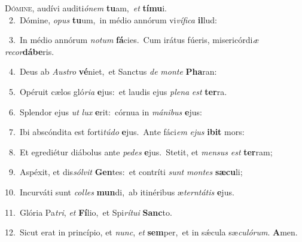 \lettrine{\initial\textcolor{\initialcolor}{D}}{ómine,} audívi auditi\-\textit{ó}\-\textit{nem} \textbf{tu}\-am,~\star \textit{et} \textbf{tí}\-\textbf{mu}i.\\
{\numbfont\textcolor{\numbcolor}{~2.}}~Dómine, \textit{o}\-\textit{pus} \textbf{tu}\-um,~\star in médio annórum vi\-\textit{ví}\-\textit{fi}\textit{ca} \textbf{il}\-lud:\par
{\numbfont\textcolor{\numbcolor}{~3.}}~In médio annórum \textit{no}\-\textit{tum} \textbf{fá}\-cies.~\star Cum irátus fúeris, misericórdi\textit{æ} \textit{re}\-\textit{cor}\textbf{dá}\textbf{be}ris.\par
{\numbfont\textcolor{\numbcolor}{~4.}}~Deus ab \textit{Aus}\-\textit{tro} \textbf{vé}\-niet,~\star et Sanctus \textit{de} \textit{mon}\-\textit{te} \textbf{Pha}\-ran:\par
{\numbfont\textcolor{\numbcolor}{~5.}}~Opéruit cælos gló\-\textit{ri}\-\textit{a} \textbf{e}\-jus:~\star et laudis ejus \textit{ple}\-\textit{na} \textit{est} \textbf{ter}\-ra.\par
{\numbfont\textcolor{\numbcolor}{~6.}}~Splendor ejus \textit{ut} \textit{lux} \textbf{e}\-rit:~\star córnua in \textit{má}\-\textit{ni}\textit{bus} \textbf{e}\-jus:\par
{\numbfont\textcolor{\numbcolor}{~7.}}~Ibi abscóndita est forti\-\textit{tú}\-\textit{do} \textbf{e}\-jus.~\star Ante fáci\textit{em} \textit{e}\-\textit{jus} \textbf{i}\-\textbf{bit} mors:\par
{\numbfont\textcolor{\numbcolor}{~8.}}~Et egrediétur diábolus ante \textit{pe}\-\textit{des} \textbf{e}\-jus.~\star Stetit, et \textit{men}\-\textit{sus} \textit{est} \textbf{ter}\-ram;\par
{\numbfont\textcolor{\numbcolor}{~9.}}~Aspéxit, et dis\-\textit{sól}\-\textit{vit} \textbf{Gen}\-tes:~\star et contríti \textit{sunt} \textit{mon}\-\textit{tes} \textbf{sæ}\-\textbf{cu}li;\par
{\numbfont\textcolor{\numbcolor}{10.}}~Incurváti sunt \textit{col}\-\textit{les} \textbf{mun}\-di,~\star ab itinéribus æ\-\textit{tern}\-\textit{tá}\textit{tis} \textbf{e}\-jus.\par
{\numbfont\textcolor{\numbcolor}{11.}}~Glória Pa\-\textit{tri}\-, \textit{et} \textbf{Fí}\-lio,~\star et Spi\-\textit{rí}\-\textit{tu}\textit{i} \textbf{Sanc}\-to.\par
{\numbfont\textcolor{\numbcolor}{12.}}~Sicut erat in princípio, et \textit{nunc}\-, \textit{et} \textbf{sem}\-per,~\star et in sǽcula sæ\-\textit{cu}\-\textit{ló}\textit{rum}. \textbf{A}\-men.\par
